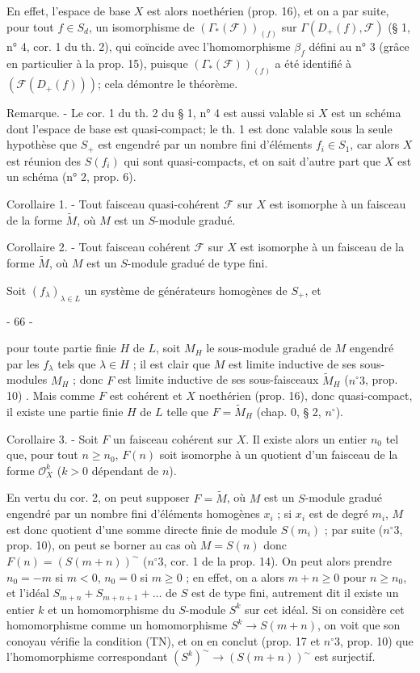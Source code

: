En effet, l'espace de base $X$ est alors noethérien (prop. 16), et on a par suite, pour tout $f \in S_d$, un isomorphisme de $(\Gamma_*(\mathcal{F}))_{(f)}$ sur $\Gamma(D_+(f), \mathcal{F})$ (§ 1, n° 4, cor. 1 du th. 2), qui coïncide avec l'homomorphisme $\beta_f$ défini au n° 3 (grâce en particulier à la prop. 15), puisque $(\Gamma_*(\mathcal{F}))_{(f)}$ a été identifié à $(\mathcal{F}(D_+(f)))$; cela démontre le théorème.

Remarque. - Le cor. 1 du th. 2 du § 1, n° 4 est aussi valable si $X$ est un schéma dont l'espace de base est quasi-compact; le th. 1 est donc valable sous la seule hypothèse que $S_+$ est engendré par un nombre fini d'éléments $f_i \in S_1$, car alors $X$ est réunion des $S(f_i)$ qui sont quasi-compacts, et on sait d'autre part que $X$ est un schéma (n° 2, prop. 6).

Corollaire 1. - Tout faisceau quasi-cohérent $\mathcal{F}$ sur $X$ est isomorphe à un faisceau de la forme $\widetilde{M}$, où $M$ est un $S$-module gradué.

Corollaire 2. - Tout faisceau cohérent $\mathcal{F}$ sur $X$ est isomorphe à un faisceau de la forme $\widetilde{M}$, où $M$ est un $S$-module gradué de type fini.

Soit $(f_\lambda)_{\lambda \in L}$ un système de générateurs homogènes de $S_+$, et

\newpage


- 66 -

pour toute partie finie $H$ de $L$, soit $M_H$ le sous-module gradué de $M$ engendré par les $f_\lambda$ tels que $\lambda \in H$ ; il est clair que $M$ est limite inductive de ses sous-modules $M_H$ ; donc $F$ est limite inductive de ses sous-faisceaux $\widetilde{M}_H$ ($n^\circ 3$, prop. 10) . Mais comme $F$ est cohérent et $X$ noethérien (prop. 16), donc quasi-compact, il existe une partie finie $H$ de $L$ telle que $F = \widetilde{M}_H$ (chap. 0, § 2, $n^\circ$).

Corollaire 3. - Soit $F$ un faisceau cohérent sur $X$. Il existe alors un entier $n_0$ tel que, pour tout $n \ge n_0$, $F(n)$ soit isomorphe à un quotient d'un faisceau de la forme $\mathcal{O}_X^k$ ($k > 0$ dépendant de $n$).

En vertu du cor. 2, on peut supposer $F = \widetilde{M}$, où $M$ est un $S$-module gradué engendré par un nombre fini d'éléments homogènes $x_i$ ; si $x_i$ est de degré $m_i$, $M$ est donc quotient d'une somme directe finie de module $S(m_i)$ ; par suite ($n^\circ 3$, prop. 10), on peut se borner au cas où $M = S(n)$ donc $F(n) = (S(m+n))^{\sim}$ ($n^\circ 3$, cor. 1 de la prop. 14). On peut alors prendre $n_0 = -m$ si $m < 0$, $n_0 = 0$ si $m \ge 0$ ; en effet, on a alors $m+n \ge 0$ pour $n \ge n_0$, et l'idéal $S_{m+n} + S_{m+n+1} + \dots$ de $S$ est de type fini, autrement dit il existe un entier $k$ et un homomorphisme du $S$-module $S^k$ sur cet idéal. Si on considère cet homomorphisme comme un homomorphisme $S^k \to S(m+n)$, on voit que son conoyau vérifie la condition (TN), et on en conclut (prop. 17 et $n^\circ 3$, prop. 10) que l'homomorphisme correspondant $(S^k)^{\sim} \to (S(m+n))^{\sim}$ est surjectif.

